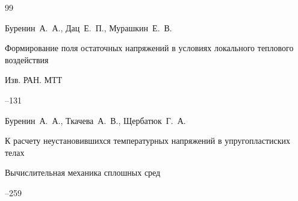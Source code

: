 \begin{thebibliography}{99}










\by Буренин~А.~А., Дац~Е.~П., Мурашкин~Е.~В.

\paper Формирование поля остаточных напряжений в условиях локального теплового воздействия  

\jour Изв. РАН. МТТ 



--131














\by Буренин~А.~А., Ткачева~А.~В., Щербатюк~Г.~А.

\paper К расчету неустановившихся температурных напряжений в упругопластиских телах

\jour Вычислительная механика сплошных сред 




--259








\end{thebibliography}
